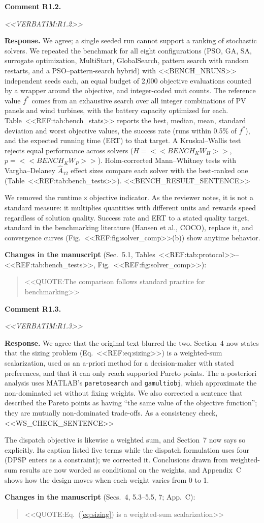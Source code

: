\documentclass[11pt]{article}
\newcounter{rc}
\newcommand{\rcomment}[2]{\stepcounter{rc}\par\medskip
  \noindent\textbf{Comment #1.}\par
  {\color{commentgrey}\itshape #2\par}}
\newcommand{\response}[1]{\par\noindent\textbf{Response.} #1\par}
\newcommand{\change}[2]{\par\noindent\textbf{Changes in the manuscript} (#1):\par
  \begin{quote}\color{revblue}#2\end{quote}}
\begin{document}
\rcomment{R1.2}{<<VERBATIM:R1.2>>}
\response{We agree; a single seeded run cannot support a ranking of stochastic solvers. We repeated the benchmark for all eight configurations (PSO, GA, SA, surrogate optimization, MultiStart, GlobalSearch, pattern search with random restarts, and a PSO--pattern-search hybrid) with <<BENCH_NRUNS>> independent seeds each, an equal budget of 2,000 objective evaluations counted by a wrapper around the objective, and integer-coded unit counts. The reference value $f^*$ comes from an exhaustive search over all integer combinations of PV panels and wind turbines, with the battery capacity optimized for each. Table~<<REF:tab:bench_stats>> reports the best, median, mean, standard deviation and worst objective values, the success rate (runs within 0.5\% of $f^*$), and the expected running time (ERT) to that target. A Kruskal--Wallis test rejects equal performance across solvers ($H=<<BENCH_KW_H>>$, $p=<<BENCH_KW_P>>$). Holm-corrected Mann--Whitney tests with Vargha--Delaney $\hat{A}_{12}$ effect sizes compare each solver with the best-ranked one (Table~<<REF:tab:bench_tests>>). <<BENCH_RESULT_SENTENCE>>

We removed the runtime\,$\times$\,objective indicator. As the reviewer notes, it is not a standard measure: it multiplies quantities with different units and rewards speed regardless of solution quality. Success rate and ERT to a stated quality target, standard in the benchmarking literature (Hansen et al., COCO), replace it, and convergence curves (Fig.~<<REF:fig:solver_comp>>(b)) show anytime behavior.}
\change{Sec.~5.1, Tables~<<REF:tab:protocol>>--<<REF:tab:bench_tests>>, Fig.~<<REF:fig:solver_comp>>}{<<QUOTE:The comparison follows standard practice for benchmarking>>}

\rcomment{R1.3}{<<VERBATIM:R1.3>>}
\response{We agree that the original text blurred the two. Section~4 now states that the sizing problem (Eq.~<<REF:eq:sizing>>) is a weighted-sum scalarization, used as an a-priori method for a decision-maker with stated preferences, and that it can only reach supported Pareto points. The a-posteriori analysis uses MATLAB's \texttt{paretosearch} and \texttt{gamultiobj}, which approximate the non-dominated set without fixing weights. We also corrected a sentence that described the Pareto points as having ``the same value of the objective function''; they are mutually non-dominated trade-offs. As a consistency check, <<WS_CHECK_SENTENCE>>

The dispatch objective is likewise a weighted sum, and Section~7 now says so explicitly. Its caption listed five terms while the dispatch formulation uses four (DPSP enters as a constraint); we corrected it. Conclusions drawn from weighted-sum results are now worded as conditional on the weights, and Appendix~C shows how the design moves when each weight varies from 0 to 1.}
\change{Secs.~4, 5.3--5.5, 7; App.~C}{<<QUOTE:Eq.~(\ref{eq:sizing}) is a weighted-sum scalarization>>}
\end{document}
